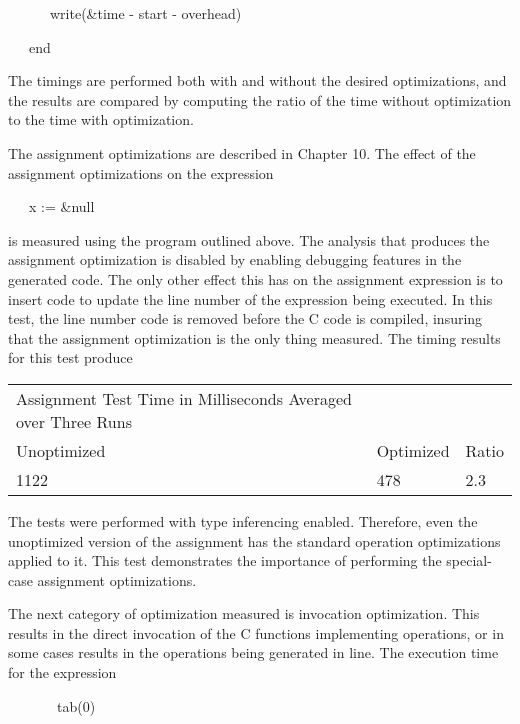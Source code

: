 {\ttfamily\mdseries
\ \ \ \ \ \ write(\&time - start - overhead)}

{\ttfamily\mdseries
\ \ \ end}

The timings are performed both with and without the desired
optimizations, and the results are compared by computing the ratio of
the time without optimization to the time with optimization.

The assignment optimizations are described in Chapter 10. The effect
of the assignment optimizations on the expression

{\ttfamily\mdseries
\ \ \ x := \&null}

\noindent is measured using the program outlined above. The analysis
that produces the assignment optimization is disabled by enabling
debugging features in the generated code. The only other effect this
has on the assignment expression is to insert code to update the line
number of the expression being executed. In this test, the line number
code is removed before the C code is compiled, insuring that the
assignment optimization is the only thing measured. The timing results
for this test produce

\begin{center}
\tablefirsthead{}
\tablehead{}
\tabletail{}
\tablelasttail{}
\begin{xtabular}{m{3.32686in}m{0.69905984in}m{0.35315984in}}
 Assignment Test\newline
Time in Milliseconds Averaged over Three Runs &
~
 &
~
\\
 Unoptimized &
 Optimized &
 Ratio\\
 1122  &
 478  &
 2.3 \\
\end{xtabular}
\end{center}

The tests were performed with type inferencing enabled. Therefore,
even the {\textquotedbl}unoptimized{\textquotedbl} version of the
assignment has the standard operation optimizations applied to
it. This test demonstrates the importance of performing the
special-case assignment optimizations.

The next category of optimization measured is invocation
optimization. This results in the direct invocation of the C functions
implementing operations, or in some cases results in the operations
being generated in line. The execution time for the expression

{\ttfamily\mdseries
\ \ \ \ \ \ \ tab(0)}

